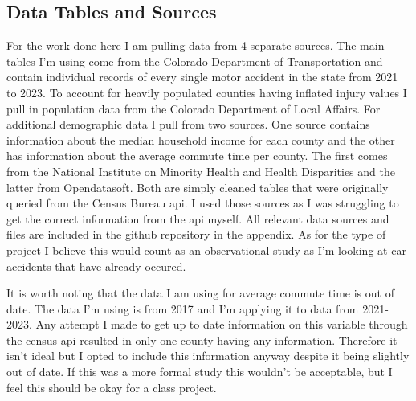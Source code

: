 \subsection*{Data Tables and Sources}

For the work done here I am pulling data from 4 separate sources. The main tables I'm using come from the Colorado Department of Transportation and contain individual records of every single motor accident in the state from 2021 to 2023. To account for heavily populated counties having inflated injury values I pull in population data from the Colorado Department of Local Affairs. For additional demographic data I pull from two sources. One source contains information about the median household income for each county and the other has information about the average commute time per county. The first comes from the National Institute on Minority Health and Health Disparities and the latter from Opendatasoft. Both are simply cleaned tables that were originally queried from the Census Bureau api. I used those sources as I was struggling to get the correct information from the api myself. All relevant data sources and files are included in the github repository in the appendix. As for the type of project I believe this would count as an observational study as I'm looking at car accidents that have already occured. 

It is worth noting that the data I am using for average commute time is out of date. The data I'm using is from 2017 and I'm applying it to data from 2021-2023. Any attempt I made to get up to date information on this variable through the census api resulted in only one county having any information. Therefore it isn't ideal but I opted to include this information anyway despite it being slightly out of date. If this was a more formal study this wouldn't be acceptable, but I feel this should be okay for a class project. 